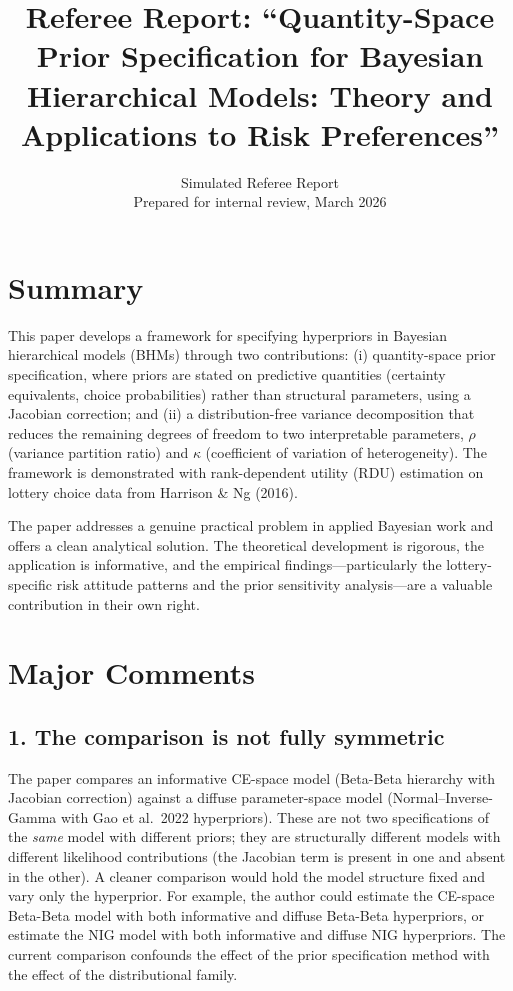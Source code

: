 \documentclass[12pt]{article}
\title{Referee Report: ``Quantity-Space Prior Specification for Bayesian
Hierarchical Models: Theory and Applications to Risk Preferences''}
\author{Simulated Referee Report\\
\small Prepared for internal review, March 2026}
\date{}
\begin{document}
\maketitle

\section*{Summary}

This paper develops a framework for specifying hyperpriors in Bayesian
hierarchical models (BHMs) through two contributions: (i) quantity-space prior
specification, where priors are stated on predictive quantities (certainty
equivalents, choice probabilities) rather than structural parameters, using a
Jacobian correction; and (ii) a distribution-free variance decomposition that
reduces the remaining degrees of freedom to two interpretable parameters,
$\rho$ (variance partition ratio) and $\kappa$ (coefficient of variation of
heterogeneity). The framework is demonstrated with rank-dependent utility (RDU)
estimation on lottery choice data from Harrison \& Ng (2016).

The paper addresses a genuine practical problem in applied Bayesian work and
offers a clean analytical solution. The theoretical development is rigorous,
the application is informative, and the empirical findings---particularly the
lottery-specific risk attitude patterns and the prior sensitivity
analysis---are a valuable contribution in their own right.

\section*{Major Comments}

\subsection*{1. The comparison is not fully symmetric}

The paper compares an informative CE-space model (Beta-Beta hierarchy with
Jacobian correction) against a diffuse parameter-space model (Normal--Inverse-Gamma
with Gao et al.\ 2022 hyperpriors). These are not two specifications of the
\textit{same} model with different priors; they are structurally different
models with different likelihood contributions (the Jacobian term is present
in one and absent in the other). A cleaner comparison would hold the model
structure fixed and vary only the hyperprior. For example, the author could
estimate the CE-space Beta-Beta model with both informative and diffuse
Beta-Beta hyperpriors, or estimate the NIG model with both informative and
diffuse NIG hyperpriors. The current comparison confounds the effect of the
prior specification method with the effect of the distributional family.
\end{document}
